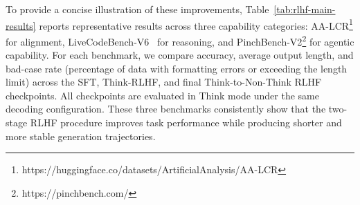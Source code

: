 To provide a concise illustration of these improvements,
Table~\ref{tab:rlhf-main-results} reports representative results across three
capability categories: AA-LCR\footnote{https://huggingface.co/datasets/ArtificialAnalysis/AA-LCR} for alignment, LiveCodeBench-V6~\cite{jain2024livecodebenchholisticcontaminationfree} for reasoning,
and PinchBench-V2\footnote{https://pinchbench.com/} for agentic capability. For each benchmark, we compare accuracy,
average output length, and bad-case rate (percentage of data with formatting errors or exceeding the length limit) across the SFT, Think-RLHF, and final
Think-to-Non-Think RLHF checkpoints. All checkpoints are evaluated in Think
mode under the same decoding configuration. These three benchmarks
 consistently show that the two-stage RLHF procedure improves task performance while producing
shorter and more stable generation trajectories.


